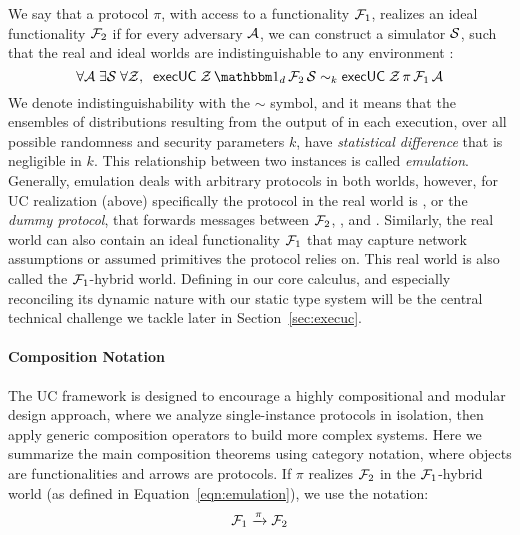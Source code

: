 We say that a protocol $\pi$, with access to a functionality $\mathcal{F}_1$, realizes an ideal functionality $\mathcal{F}_2$
if for every adversary $\mathcal{A}$, we can construct a simulator $\mathcal{S}$, such that the real and ideal worlds are indistinguishable to any environment \Z:
\begin{equation}
  \label{eqn:emulation}
  \forall \A \; \exists \Sim \; \forall \Z, \; \; \msf{execUC} \; \Z \, \idealP \, \F_2 \, \Sim \sim_k \msf{execUC} \; \Z \, \pi \, \F_1 \, \A
\end{equation}
We denote indistinguishability with the $\sim$ symbol, and it means that the ensembles of distributions resulting from the output of \Z
in each execution, over all possible randomness and security parameters $k$, have \emph{statistical difference} that is negligible in $k$.
This relationship between two  instances is called \emph{emulation}. 
Generally, emulation deals with arbitrary protocols in both worlds, however, for UC realization (above) specifically the protocol in the
real world is \idealP, or the \emph{dummy protocol}, that forwards messages between $\mathcal{F}_2$, \Z,  and \A. 
Similarly, the real world can also contain an ideal functionality $\mathcal{F}_1$ that may capture network assumptions or assumed primitives the protocol relies on. 
This real world is also called the $\mathcal{F}_1$-hybrid world.
Defining  in our core calculus, and especially reconciling its dynamic nature with our static type system will be the central technical challenge
we tackle later in Section~\ref{sec:execuc}.

\paragraph*{\textbf{Composition Notation}}
The UC framework is designed to encourage a highly compositional and modular design approach,
where we analyze single-instance protocols in isolation, then apply generic composition operators to build more complex systems.
Here we summarize the main composition theorems using category notation, where objects are functionalities and arrows are protocols.
If $\pi$ realizes $\mathcal{F}_2$ in the $\mathcal{F}_1$-hybrid world (as defined in Equation~\ref{eqn:emulation}), we use the notation:
\[
	\mathcal{F}_1 \xrightarrow{\pi} \mathcal{F}_2
\]

